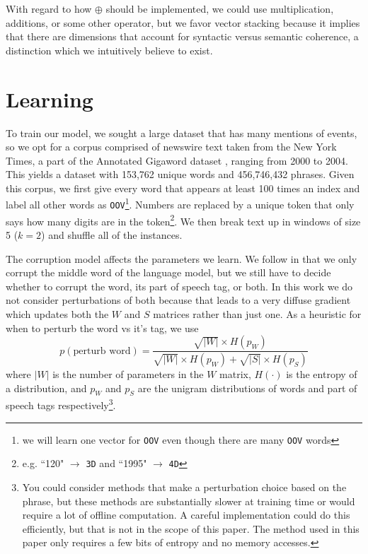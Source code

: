 \documentclass[11pt,letterpaper]{article}
\begin{document}
With regard to how $\oplus$ should be implemented, we could use multiplication,
additions, or some other operator, but we favor vector stacking because it
implies that there are dimensions that account for syntactic versus semantic
coherence, a distinction which we intuitively believe to exist.



\section{Learning} %
To train our model, we sought a large dataset that has many mentions of events,
so we opt for a corpus comprised of newswire text taken from the New York Times,
a part of the Annotated Gigaword dataset \cite{agiga}, ranging from 2000 to 2004.
This yields a dataset with 153,762 unique words and 456,746,432 phrases.
Given this corpus, we first give every word that appears at least 100
times an index and label all other words as \texttt{OOV}\footnote{we will learn
one vector for \texttt{OOV} even though there are many \texttt{OOV} words}.
Numbers are replaced by a unique token that only says how many digits are in
the token\footnote{e.g. ``120" $\rightarrow$ \texttt{3D} and ``1995" $\rightarrow$ \texttt{4D}}.
We then break text up in windows of size 5 ($k=2$) and shuffle all of the instances.


The corruption model affects the parameters we learn.
We follow \cite{rami} in that we only corrupt the middle word of the language model,
but we still have to decide whether to corrupt the word, its part of speech tag, or both.
In this work we do not consider perturbations of both because that leads to a very
diffuse gradient which updates both the $W$ and $S$ matrices rather than just one.
As a heuristic for when to perturb the word vs it's tag, we use
\[
	p(\mbox{perturb word}) = \frac
		{\sqrt{|W|} \times H(p_W)}
	{\sqrt{|W|} \times H(p_W) + \sqrt{|S|} \times H(p_S)}
\]
where $|W|$ is the number of parameters in the $W$ matrix, $H(\cdot)$ is
the entropy of a distribution, and $p_W$ and $p_S$ are the unigram distributions
of words and part of speech tags respectively\footnote{You could consider methods
that make a perturbation choice based on the phrase, but these methods are
substantially slower at training time or would require a lot of offline computation.
A careful implementation could do this efficiently, but that is not in the scope of this paper.
The method used in this paper only requires a few bits of entropy and no memory accesses.}.
\end{document}
